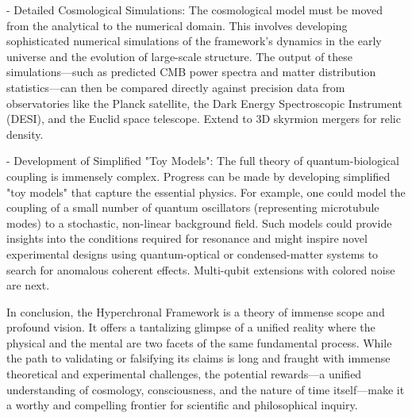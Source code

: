 \documentclass[12pt]{article}
\theoremstyle{definition}
\begin{document}
- Detailed Cosmological Simulations: The cosmological model must be moved from the analytical to the numerical domain. This involves developing sophisticated numerical simulations of the framework's dynamics in the early universe and the evolution of large-scale structure. The output of these simulations—such as predicted CMB power spectra and matter distribution statistics—can then be compared directly against precision data from observatories like the Planck satellite, the Dark Energy Spectroscopic Instrument (DESI), and the Euclid space telescope. Extend to 3D skyrmion mergers for relic density.

- Development of Simplified "Toy Models": The full theory of quantum-biological coupling is immensely complex. Progress can be made by developing simplified "toy models" that capture the essential physics. For example, one could model the coupling of a small number of quantum oscillators (representing microtubule modes) to a stochastic, non-linear background field. Such models could provide insights into the conditions required for resonance and might inspire novel experimental designs using quantum-optical or condensed-matter systems to search for anomalous coherent effects. Multi-qubit extensions with colored noise are next.

In conclusion, the Hyperchronal Framework is a theory of immense scope and profound vision. It offers a tantalizing glimpse of a unified reality where the physical and the mental are two facets of the same fundamental process. While the path to validating or falsifying its claims is long and fraught with immense theoretical and experimental challenges, the potential rewards—a unified understanding of cosmology, consciousness, and the nature of time itself—make it a worthy and compelling frontier for scientific and philosophical inquiry.
\end{document}
